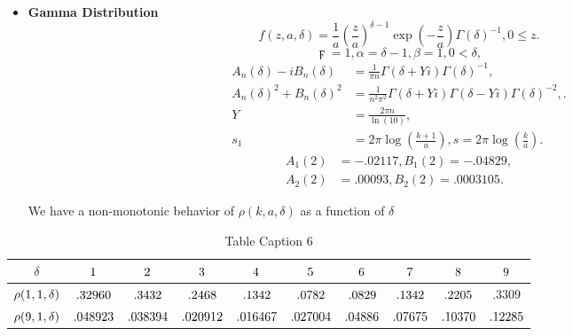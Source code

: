 \documentclass[titlepage,fleqn]{article}%
\begin{document}
\begin{itemize}
\item \textbf{Gamma Distribution}%
\[
f(z,a,\delta)=\frac{1}{a}\left(  \frac{z}{a}\right)  ^{\delta-1}\exp\left(
-\frac{z}{a}\right)  \Gamma\left(  \delta\right)  ^{-1},0\leq z.
\]%
\[
\digamma=1,\alpha=\delta-1,\beta=1,0<\delta,
\]%
\begin{align}
A_{n}(\delta)-iB_{n}(\delta) &  =\frac{1}{\pi n}\Gamma\left(  \delta
+Yi\right)  \Gamma\left(  \delta\right)  ^{-1},\\
A_{n}(\delta)^{2}+B_{n}(\delta)^{2} &  =\frac{1}{n^{2}\pi^{2}}\Gamma\left(
\delta+Yi\right)  \Gamma\left(  \delta-Yi\right)  \Gamma\left(  \delta\right)
^{-2},.\\
Y &  =\frac{2\pi n}{\ln(10)},\\
s_{1} &  =2\pi\log\left(  \frac{k+1}{a}\right)  ,s=2\pi\log\left(  \frac{k}%
{a}\right)  .
\end{align}%
\begin{align}
A_{1}(2) &  =-.02117,B_{1}(2)=-.04829,\\
A_{2}(2) &  =.00093,B_{2}(2)=.0003105.
\end{align}


We have a non-monotonic behavior of $\rho(k,a,\delta)$ as a function of
$\delta$
\end{itemize}

%

\begin{table}[!htbp] \centering
\begin{tabular}
[c]{|c|c|c|c|c|c|c|c|c|c|}\hline\hline
$\delta$ & ${\small 1}$ & ${\small 2}$ & ${\small 3}$ & ${\small 4}$ &
${\small 5}$ & ${\small 6}$ & ${\small 7}$ & ${\small 8}$ & ${\small 9}%
$\\\hline
${\small \rho(1,1,\delta)}$ & ${\small .32960}$ & ${\small .3432}$ &
${\small .2468}$ & ${\small .1342}$ & ${\small .0782}$ & ${\small .0829}$ &
${\small .1342}$ & ${\small .2205}$ & {\small .}$3309$\\\hline
${\small \rho(9,1,\delta)}$ & ${\small .048923}$ & ${\small .038394}$ &
${\small .020912}$ & ${\small .016467}$ & ${\small .027004}$ &
${\small .04886}$ & ${\small .07675}$ & ${\small .10370}$ & ${\small .12285}%
$\\\hline\hline
\end{tabular}
\caption{Table Caption 6}\label{TableKey6}%
\end{table}%
\end{document}
